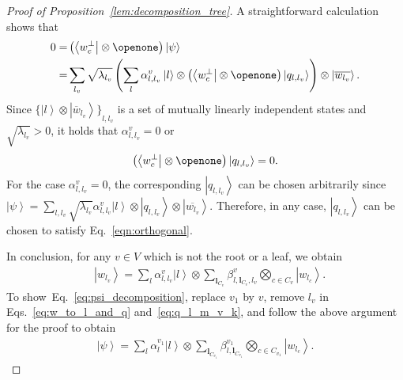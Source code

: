 \documentclass[preprintnumbers,aps,amsmath,amssymb,pra,twocolumn,showpacs,superscriptaddress,floatfix]{revtex4-1}
\def\Bra#1{\left\langle#1\right|}
\def\Ket#1{\left|#1\right\rangle}
\theoremstyle{plain}
\theoremstyle{definition}
\theoremstyle{remark}
\begin{document}
\begin{proof}[Proof of Proposition~\ref{lem:decomposition_tree}]
A straightforward calculation shows that
    \[
        \begin{split}
            0 =& \left(\Bra{w_c^{\perp}}\otimes \openone\right)\Ket{\psi} \\
            =& \sum_{l_v}\sqrt{\lambda_{l_v}}\left(\sum_{l}\alpha^{v}_{l,l_v}\Ket{l}\otimes 
                \left(\Bra{w_c^{\perp}}\otimes \openone\right)\Ket{q_{l, l_v}}\right)\otimes
            \Ket{\overline{w_{l_v}}}.
        \end{split}
    \]
    Since ${\{ \Ket{l}\otimes\Ket{\overline{w}_{l_v}} \}}_{l, l_v}$ is a set of mutually linearly independent states and $\sqrt{\lambda_{l_v}}>0$, it holds that $\alpha^{v}_{l,l_v}=0$ or 
\begin{equation}
        \left(\Bra{w_c^{\perp}}\otimes \openone\right)\Ket{q_{l, l_v}}=0.
\label{eqn:orthogonal}
\end{equation}
For the case $\alpha^{v}_{l,l_v}=0$, the corresponding $\Ket{q_{l, l_v}}$ can be chosen arbitrarily since $\Ket{\psi} = \sum_{l,l_v}\sqrt{\lambda_{l_v}}\alpha^{v}_{l,l_v}\Ket{l}\otimes \Ket{q_{l, l_v}}\otimes
\Ket{\overline{w_{l_v}}}$.  Therefore, in any case, $\Ket{q_{l, l_v}}$ can be chosen to satisfy Eq.~\eqref{eqn:orthogonal}.

    In conclusion, for any $v\in V$ which is not the root or a leaf, we obtain
    \begin{align*}
        &\Ket{w_{l_v}} = \sum_{l}\alpha^{v}_{l,l_v} \Ket{l}  \otimes 
        \sum_{\boldsymbol{l}_{C_v}}
        \beta_{l,\boldsymbol{l}_{C_v},l_v}^{v}  \bigotimes_{c\in C_{v}}\Ket{w_{l_c}}.
    \end{align*}
    To show~Eq.~\eqref{eq:psi_decomposition}, replace $v_1$ by $v$, remove $l_v$ in Eqs.~\eqref{eq:w_to_l_and_q} and~\eqref{eq:q_l_m_v_k}, and follow the above argument for the proof to obtain
    \begin{align*}
    \Ket{\psi} = \sum_{l}\alpha^{v_1}_l \Ket{l}  \otimes 
    \sum_{\boldsymbol{l}_{C_{v_1}}}
    \beta_{l,\boldsymbol{l}_{C_{v_1}}}^{v_1}  \bigotimes_{c\in C_{v_1}}\Ket{w_{l_c}}.
 \end{align*}

\end{proof}
\end{document}
